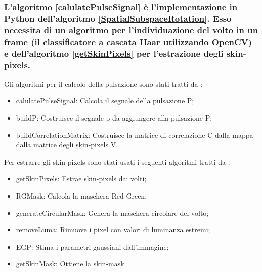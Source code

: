 \documentclass[journal,A4paper,compsoc,epsfig]{IEEEtran}
\begin{document}
      \subsubsection{L'algoritmo \ref{calulatePulseSignal} è l'implementazione in Python dell'algoritmo \ref{SpatialSubspaceRotation}. Esso necessita di un algoritmo per l'individuazione del volto in un frame (il classificatore a cascata Haar utilizzando OpenCV) e dell'algoritmo \ref{getSkinPixels} per l'estrazione degli skin-pixels.}
        Gli algoritmi per il calcolo della pulsazione sono stati tratti da \cite{wang-tbe-2016}:
        \begin{itemize}
          \item calulatePulseSignal: Calcola il segnale della pulsazione P;
          \item buildP: Costruisce il segnale p da aggiungere alla pulsazione P;
          \item buildCorrelationMatrix: Costruisce la matrice di correlazione C dalla mappa dalla matrice degli skin-pixels V.
        \end{itemize}
        \noindent
        Per estrarre gli skin-pixels sono stati usati i seguenti algoritmi tratti da \cite{adaptive_skin_segmentation}:
        \begin{itemize}
          \item getSkinPixels: Estrae skin-pixels dai volti;
          \item RGMask: Calcola la maschera Red-Green;
          \item generateCircularMask: Genera la maschera circolare del volto;
          \item removeLuma: Rimuove i pixel con valori di luminanza estremi;
          \item EGP: Stima i parametri gaussiani dall'immagine;
          \item getSkinMask: Ottiene la skin-mask.
        \end{itemize}
\end{document}
